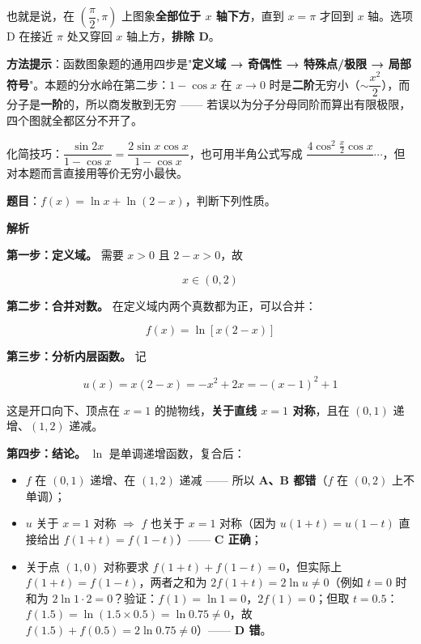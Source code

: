 也就是说，在 $\left(\dfrac\pi2,\pi\right)$ 上图象\textbf{全部位于 $x$ 轴下方}，直到 $x=\pi$ 才回到 $x$ 轴。选项 D 在接近 $\pi$ 处又穿回 $x$ 轴上方，\textbf{排除 D}。


\begin{gktip}
\textbf{方法提示}：函数图象题的通用四步是"\textbf{定义域 → 奇偶性 → 特殊点/极限 → 局部符号}"。本题的分水岭在第二步：$1-\cos x$ 在 $x\to0$ 时是\textbf{二阶}无穷小（$\sim\dfrac{x^{2}}2$），而分子是\textbf{一阶}的，所以商发散到无穷 —— 若误以为分子分母同阶而算出有限极限，四个图就全都区分不开了。

化简技巧：$\dfrac{\sin2x}{1-\cos x}=\dfrac{2\sin x\cos x}{1-\cos x}$，也可用半角公式写成 $\dfrac{4\cos^{2}\frac x2\cos x}{\ }\cdots$，但对本题而言直接用等价无穷小最快。
\end{gktip}

\par\medskip


\textbf{题目}：$f(x)=\ln x+\ln(2-x)$，判断下列性质。

\textbf{解析}

\textbf{第一步：定义域。} 需要 $x>0$ 且 $2-x>0$，故

\[x\in(0,2)\]

\textbf{第二步：合并对数。} 在定义域内两个真数都为正，可以合并：

\[f(x)=\ln\left[x(2-x)\right]\]

\textbf{第三步：分析内层函数。} 记

\[u(x)=x(2-x)=-x^{2}+2x=-(x-1)^{2}+1\]

这是开口向下、顶点在 $x=1$ 的抛物线，\textbf{关于直线 $x=1$ 对称}，且在 $(0,1)$ 递增、$(1,2)$ 递减。

\textbf{第四步：结论。} $\ln$ 是单调递增函数，复合后：

\begin{itemize}
\item $f$ 在 $(0,1)$ 递增、在 $(1,2)$ 递减 —— 所以 \textbf{A、B 都错}（$f$ 在 $(0,2)$ 上不单调）；
\item $u$ 关于 $x=1$ 对称 $\Rightarrow$ $f$ 也关于 $x=1$ 对称（因为 $u(1+t)=u(1-t)$ 直接给出 $f(1+t)=f(1-t)$）—— \textbf{C 正确}；
\item 关于点 $(1,0)$ 对称要求 $f(1+t)+f(1-t)=0$，但实际上 $f(1+t)=f(1-t)$，两者之和为 $2f(1+t)=2\ln u\ne0$（例如 $t=0$ 时和为 $2\ln1\cdot2=0$？验证：$f(1)=\ln1=0$，$2f(1)=0$；但取 $t=0.5$：$f(1.5)=\ln(1.5\times0.5)=\ln0.75\ne0$，故 $f(1.5)+f(0.5)=2\ln0.75\ne0$）—— \textbf{D 错}。
\end{itemize}

